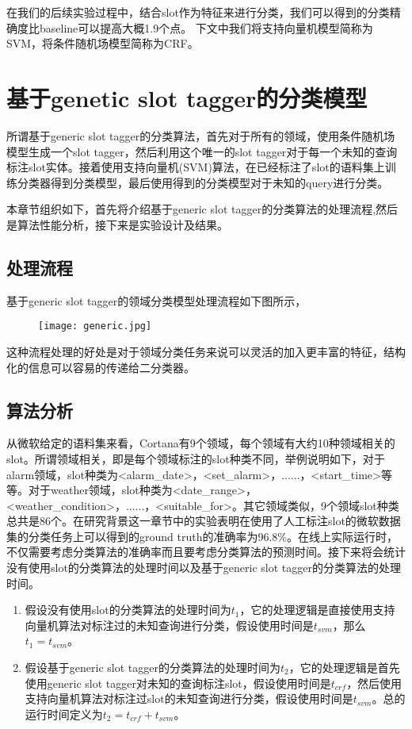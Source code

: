 \documentclass[master]{njuthesis}
\begin{document}
在我们的后续实验过程中，结合slot作为特征来进行分类，我们可以得到的分类精确度比baseline可以提高大概1.9个点。
下文中我们将支持向量机模型简称为SVM，将条件随机场模型简称为CRF。

\section{基于genetic slot tagger的分类模型}

    所谓基于generic slot tagger的分类算法，首先对于所有的领域，使用条件随机场模型生成一个slot tagger，然后利用这个唯一的slot tagger对于每一个未知的查询标注slot实体。接着使用支持向量机(SVM)算法，在已经标注了slot的语料集上训练分类器得到分类模型，最后使用得到的分类模型对于未知的query进行分类。
    
    本章节组织如下，首先将介绍基于generic slot tagger的分类算法的处理流程,然后是算法性能分析，接下来是实验设计及结果。

\subsection{处理流程}

    基于generic slot tagger的领域分类模型处理流程如下图所示，
    \begin{figure}[htbp]
      \centering
      \texttt{[image: generic.jpg]}
      \caption{}\label{fig:test1}
    \end{figure}
    
    这种流程处理的好处是对于领域分类任务来说可以灵活的加入更丰富的特征，结构化的信息可以容易的传递给二分类器。

\subsection{算法分析}

    从微软给定的语料集来看，Cortana有9个领域，每个领域有大约10种领域相关的slot。所谓领域相关，即是每个领域标注的slot种类不同，举例说明如下，对于alarm领域，slot种类为<alarm\_date>，<set\_alarm>，......，<start\_time>等等。对于weather领域，slot种类为<date\_range>，<weather\_condition>，......，<suitable\_for>。其它领域类似，9个领域slot种类总共是86个。在研究背景这一章节中的实验表明在使用了人工标注slot的微软数据集的分类任务上可以得到的ground truth的准确率为96.8\%。在线上实际运行时，不仅需要考虑分类算法的准确率而且要考虑分类算法的预测时间。接下来将会统计没有使用slot的分类算法的处理时间以及基于generic slot tagger的分类算法的处理时间。

\begin{enumerate}
 \item 假设没有使用slot的分类算法的处理时间为$t_1$，它的处理逻辑是直接使用支持向量机算法对标注过的未知查询进行分类，假设使用时间是$t_{svm}$，那么$t_1 = t_{svm}$。
 \item 假设基于generic slot tagger的分类算法的处理时间为$t_2$，它的处理逻辑是首先使用generic slot tagger对未知的查询标注slot，假设使用时间是$t_{crf}$，然后使用支持向量机算法对标注过slot的未知查询进行分类，假设使用时间是$t_{svm}$。总的运行时间定义为$t_2 = t_{crf} + t_{svm}$。
\end{enumerate}
\end{document}
